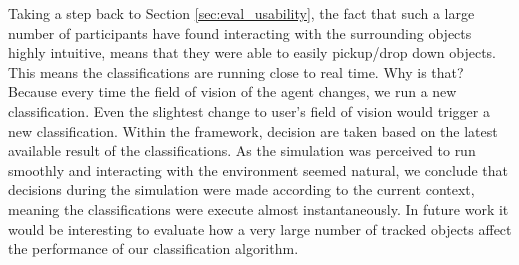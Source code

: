 Taking a step back to Section \ref{sec:eval_usability}, the fact that such a large number of participants have found interacting with the surrounding objects highly intuitive, means that they were able to easily pickup/drop down objects. This means the classifications are running close to real time. Why is that? Because every time the field of vision of the agent changes, we run a new classification. Even the slightest change to user's field of vision would trigger a new classification. Within the framework, decision are taken based on the latest available result of the classifications. As the simulation was perceived to run smoothly and interacting with the environment seemed natural, we conclude that decisions during the simulation were made according to the current context, meaning the classifications were execute almost instantaneously. In future work it would be interesting to evaluate how a very large number of tracked objects affect the performance of our classification algorithm.

